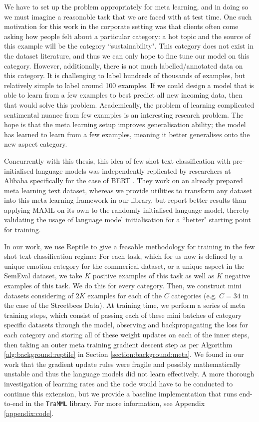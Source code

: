We have to set up the problem appropriately for meta learning, and in doing so we must imagine a reasonable task that we are faced with at test time. One such motivation for this work in the corporate setting was that clients often come asking how people felt about a particular category: a hot topic and the source of this example will be the category ``sustainability". This category does not exist in the dataset literature, and thus we can only hope to fine tune our model on this category. However, additionally, there is not much labelled/annotated data on this category. It is challenging to label hundreds of thousands of examples, but relatively simple to label around 100 examples. If we could design a model that is able to learn from a few examples to best predict all new incoming data, then that would solve this problem. Academically, the problem of learning complicated sentimental nuance from few examples is an interesting research problem. The hope is that the meta learning setup improves generalisation ability; the model has learned to learn from a few examples, meaning it better generalises onto the new aspect category. 

Concurrently with this thesis, this idea of few shot text classification with pre-initialised language models was independently replicated by researchers at Alibaba specifically for the case of BERT \cite{Yu}. They work on an already prepared meta learning text dataset, whereas we provide utilities to transform any dataset into this meta learning framework in our library, but report better results than applying MAML on its own to the randomly initialised language model, thereby validating the usage of language model initialisation for a ``better" starting point for training.

In our work, we use Reptile \cite{Nichol} to give a feasable methodology for training in the few shot text classification regime: For each task, which for us now is defined by a unique emotion category for the commerical dataset, or a unique aspect in the SemEval dataset, we take $K$ positive examples of this task as well as $K$ negative examples of this task. We do this for every category. Then, we construct mini datasets considering of $2K$ examples for each of the $C$ categories (e.g. $C=34$ in the case of the Streetbees Data). At training time, we perform a series of meta training steps, which consist of passing each of these mini batches of category specific datasets through the model, observing and backpropagating the loss for each category and storing all of these weight updates on each of the inner steps, then taking an outer meta training gradient descent step as per Algorithm \ref{alg:background:reptile} in Section \ref{section:background:meta}. We found in our work that the gradient update rules were fragile and possibly mathematically unstable and thus the language models did not learn effectively. A more thorough investigation of learning rates and the code would have to be conducted to continue this extension, but we provide a baseline implementation that runs end-to-end in the \texttt{TraMML} library. For more information, see Appendix \ref{appendix:code}.

